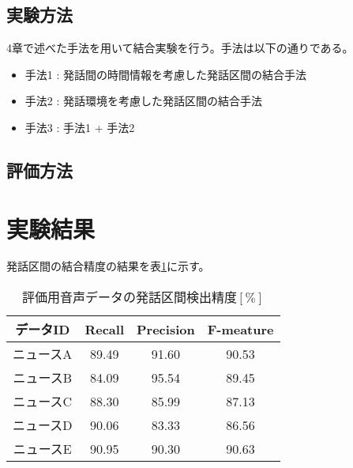 \subsection{実験方法}
4章で述べた手法を用いて結合実験を行う。手法は以下の通りである。

\begin{itemize}
\item 手法1 : 発話間の時間情報を考慮した発話区間の結合手法
\item 手法2 : 発話環境を考慮した発話区間の結合手法
\item 手法3 : 手法1 + 手法2
\end{itemize}\par\par

\subsection{評価方法}

\section{実験結果}
発話区間の結合精度の結果を表\ref{table:result_connect}に示す。

\begin{table}[htb]
  \begin{center}
    \caption{評価用音声データの発話区間検出精度$[\%]$ \label{table:result_connect}}
    \begin{tabular}{|c||c|c|c|} \hline
      データID & Recall & Precision & F-meature \\ \hline
      ニュースA & 89.49 & 91.60 & 90.53 \\ \hline
      ニュースB & 84.09 & 95.54 & 89.45\\ \hline
      ニュースC & 88.30 & 85.99 & 87.13 \\ \hline
      ニュースD & 90.06 & 83.33 & 86.56\\ \hline
      ニュースE & 90.95 & 90.30 & 90.63\\ \hline
    \end{tabular}
  \end{center}
   
\end{table}